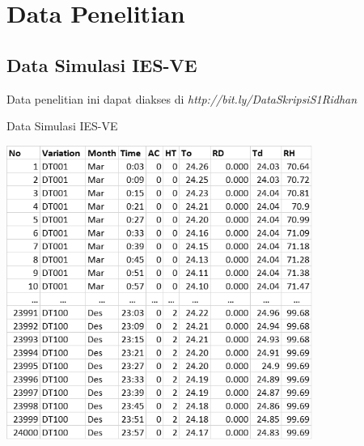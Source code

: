 \chapter{Data Penelitian}

\section{Data Simulasi IES-VE}
Data penelitian ini dapat diakses di \textit{http://bit.ly/DataSkripsiS1Ridhan}

\begin{table}[!h]
	\caption{Data Simulasi IES-VE}
	\label{tbl:A:DataSkripsiRidhan}
	\centering
	\includegraphics[width=0.75\textwidth]{figures/DataSkripsiRidhan}
\end{table}
\vspace{3em}
\hfill\break
\hfill\break

